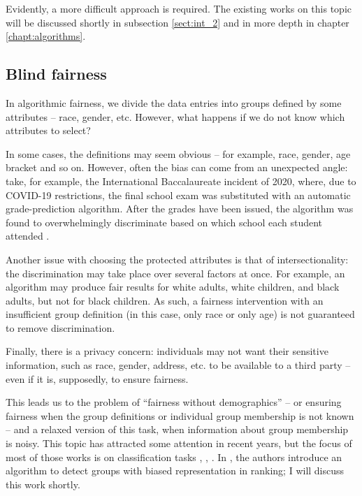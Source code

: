 Evidently, a more difficult approach is required. The existing works on this topic will be discussed shortly in subsection \ref{sect:int_2} and in more depth in chapter \ref{chapt:algorithms}.

\subsection{Blind fairness}\label{subsect:int_1_1}

In algorithmic fairness, we divide the data entries into groups defined by some attributes – race, gender, etc. However, what happens if we do not know which attributes to select?

In some cases, the definitions may seem obvious – for example, race, gender, age bracket and so on. However, often the bias can come from an unexpected angle: take, for example, the International Baccalaureate incident of 2020, where, due to COVID-19 restrictions, the final school exam was substituted with an automatic grade-prediction algorithm. After the grades have been issued, the algorithm was found to overwhelmingly discriminate based on which school each student attended \cite{nyt_baccalaureate}.

Another issue with choosing the protected attributes is that of intersectionality: the discrimination may take place over several factors at once. For example, an algorithm may produce fair results for white adults, white children, and black adults, but not for black children. As such, a fairness intervention with an insufficient group definition (in this case, only race or only age) is not guaranteed to remove discrimination.

Finally, there is a privacy concern: individuals may not want their sensitive information, such as race, gender, address, etc. to be available to a third party – even if it is, supposedly, to ensure fairness.

This leads us to the problem of “fairness without demographics” – or ensuring fairness when the group definitions or individual group membership is not known – and a relaxed version of this task, when information about group membership is noisy. This topic has attracted some attention in recent years, but the focus of most of those works is on classification tasks \cite{https://arxiv.org/pdf/1904.05419.pdf}, \cite{MithraCoverage}, \cite{https://www.vldb.org/pvldb/vol14/p2719-moskovitch.pdf}. In \cite{detectionofgroups}, the authors introduce an algorithm to detect groups with biased representation in ranking; I will discuss this work shortly.

